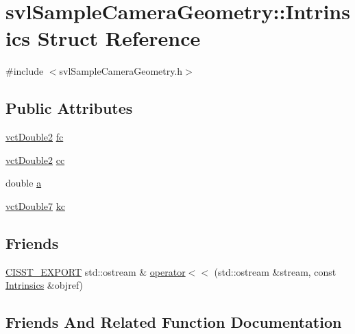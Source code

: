 \hypertarget{structsvl_sample_camera_geometry_1_1_intrinsics}{}\section{svl\+Sample\+Camera\+Geometry\+:\+:Intrinsics Struct Reference}
\label{structsvl_sample_camera_geometry_1_1_intrinsics}


{\ttfamily \#include $<$svl\+Sample\+Camera\+Geometry.\+h$>$}

\subsection*{Public Attributes}
\begin{DoxyCompactItemize}
\item 
\hyperlink{vct_fixed_size_vector_types_8h_afc0fdcc41cbe8b043747612501610812}{vct\+Double2} \hyperlink{structsvl_sample_camera_geometry_1_1_intrinsics_a695218668b61d9a523078479ffa9f336}{fc}
\item 
\hyperlink{vct_fixed_size_vector_types_8h_afc0fdcc41cbe8b043747612501610812}{vct\+Double2} \hyperlink{structsvl_sample_camera_geometry_1_1_intrinsics_a8389a02bf8568e620b28357cfe929fd4}{cc}
\item 
double \hyperlink{structsvl_sample_camera_geometry_1_1_intrinsics_acc4d74ab02068cce2268ce6f622b2b78}{a}
\item 
\hyperlink{vct_fixed_size_vector_types_8h_a600a52ac438879e14dd78db8002d2681}{vct\+Double7} \hyperlink{structsvl_sample_camera_geometry_1_1_intrinsics_a6c912ef66be611a6d9815e1910b27f4f}{kc}
\end{DoxyCompactItemize}
\subsection*{Friends}
\begin{DoxyCompactItemize}
\item 
\hyperlink{cmn_export_macros_8h_a99393e0c3ac434b2605235bbe20684f8}{C\+I\+S\+S\+T\+\_\+\+E\+X\+P\+O\+R\+T} std\+::ostream \& \hyperlink{structsvl_sample_camera_geometry_1_1_intrinsics_a6c2c0ff871a8f9bf6e1923772f097843}{operator$<$$<$} (std\+::ostream \&stream, const \hyperlink{structsvl_sample_camera_geometry_1_1_intrinsics}{Intrinsics} \&objref)
\end{DoxyCompactItemize}


\subsection{Friends And Related Function Documentation}
\hypertarget{structsvl_sample_camera_geometry_1_1_intrinsics_a6c2c0ff871a8f9bf6e1923772f097843}{}
